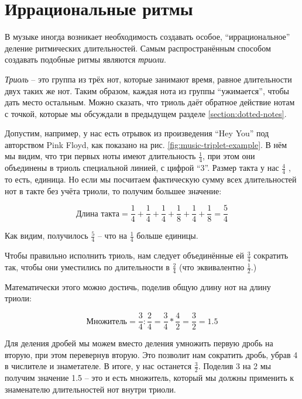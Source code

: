 \documentclass[../sparc.tex]{subfiles}
\begin{document}
\section{Иррациональные ритмы}

В музыке иногда возникает необходимость создавать особое, ``иррациональное''
деление ритмических длительностей.  Самым распространённым способом создавать
подобные ритмы являются \emph{триоли}.

\emph{Триоль} -- это группа из трёх нот, которые занимают время, равное
длительности двух таких же нот.  Таким образом, каждая нота из группы
``ужимается'', чтобы дать место остальным.  Можно сказать, что триоль даёт
обратное действие нотам с точкой, которые мы обсуждали в предыдущем разделе
\ref{section:dotted-notes}.


Допустим, например, у нас есть отрывок из произведения ``Hey You'' под
авторством Pink Floyd, как показано на рис. \ref{fig:music-triplet-example}.  В
нём мы видим, что три первых ноты имеют длительность $\frac{1}{4}$, при этом они
объединены в триоль специальной линией, с цифрой ``3''.  Размер такта у нас
$\frac{4}{4}$ , то есть, единица.  Но если мы посчитаем фактическую сумму всех
длительностей нот в такте без учёта триоли, то получим большее значение:

\begin{equation}
  \mbox{Длина такта} = \frac{1}{4} + \frac{1}{4}
  + \frac{1}{4} + \frac{1}{8} + \frac{1}{4} + \frac{1}{8} = \frac{5}{4}
\end{equation}

Как видим, получилось $\frac{5}{4}$ -- что на $\frac{1}{4}$ больше единицы.

Чтобы правильно исполнить триоль, нам следует объединённые ей $\frac{3}{4}$
сократить так, чтобы они уместились по длительности в $\frac{2}{4}$ (что
эквивалентно $\frac{1}{2}$.)

Математически этого можно достичь, поделив общую длину нот на длину триоли:

\begin{equation}
  \mbox{Множитель} = \frac{3}{4} : \frac{2}{4} = \frac{3}{4} * \frac{4}{2}
  = \frac{3}{2} = 1.5
\end{equation}

Для деления дробей мы можем вместо деления умножить первую дробь на вторую, при
этом перевернув вторую.  Это позволит нам сократить дробь, убрав 4 в числителе и
знаметателе.  В итоге, у нас останется $\frac{3}{2}$.  Поделив 3 на 2 мы получим
значение 1.5 -- это и есть множитель, который мы должны применить к знаменателю
длительностей нот внутри триоли.
\end{document}
